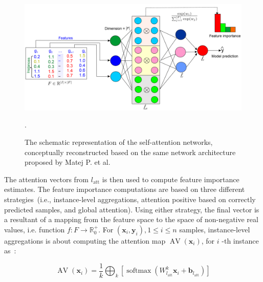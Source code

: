 \begin{figure}
	\centering
	\includegraphics[scale=0.55]{images/san.png}	
	\caption{The schematic representation of the self-attention networks, conceptually reconstructed based on the same network architecture proposed by Matej P. et al.~\cite{vskrlj2020feature}}.
	\label{fig:san}
\end{figure}

\hspace*{3.5mm} The attention vectors from $l_{\text {att}}$ is then used to compute feature importance estimates. The feature importance computations are based on three different strategies~(i.e., instance-level aggregations, attention positive based on correctly predicted samples, and global attention). Using either strategy,  the final vector is a resultant of a mapping from the feature space to the space of non-negative real values, i.e. function $f: F \rightarrow \mathbb{R}_{0}^{+}$. 
For $\left(\boldsymbol{x}_{i}, \boldsymbol{y}_{i}\right), 1 \leq i \leq n$ samples, instance-level aggregations is about computing the attention map $\operatorname{AV}\left(\boldsymbol{x}_{i}\right)$, for $i$ -th instance as~\cite{vskrlj2020feature}: 

\begin{equation}
    \operatorname{AV}\left(\boldsymbol{x}_{i}\right)=\frac{1}{k} \bigoplus_{k}\left[\operatorname{softmax}\left(W_{l_{\mathrm{att}}}^{k} \boldsymbol{x}_{i}+\boldsymbol{b}_{l_{\mathrm{att}}}\right)\right]
\end{equation}

